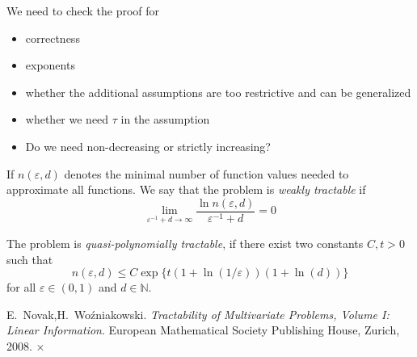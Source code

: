 \documentclass[11pt,a4paper]{article}
\newcommand{\fred}[1]{\begingroup\color{blue}#1\endgroup}
\begin{document}
\fred{We need to check the proof for
\begin{itemize}
\item correctness
\item exponents
\item whether the additional assumptions are too restrictive and can be generalized
\item whether we need $\tau$ in the assumption
\item Do we need non-decreasing or strictly increasing?
\end{itemize}}
\begin{definition}
If $n(\varepsilon,d)$ denotes the minimal number of function values needed to approximate all functions. We say that the problem is \emph{weakly tractable} if
    \[\lim_{\varepsilon^{-1}+d\rightarrow \infty} \frac{\ln n(\varepsilon,d)}{\varepsilon^{-1}+d} = 0\]
\end{definition}
\begin{definition}
    The problem is \emph{quasi-polynomially tractable}, if there exist two constants $C, t> 0$ such that
    \[
    n(\varepsilon,d) \leq C\exp\{t(1+\ln(1/\varepsilon))(1+\ln(d))\}
    \] for all $\varepsilon \in (0,1)$ and $d\in\mathbb{N}$.
\end{definition}
\begin{thebibliography}{99}

 E.~Novak,H.~Wo\'zniakowski. \textit{Tractability of Multivariate Problems, Volume I: Linear Information}.
European Mathematical Society Publishing House, Zurich, 2008.
 ×
\end{thebibliography}
\end{document}
